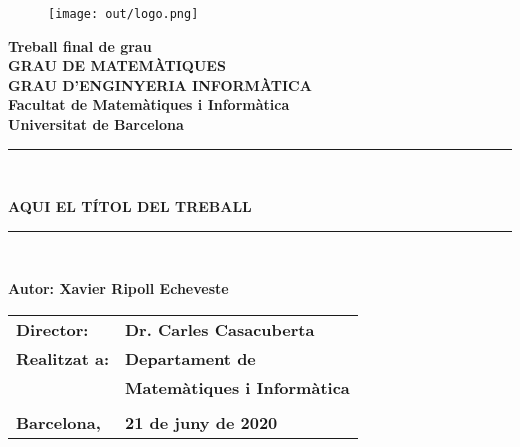 \pagestyle{empty}

\begin{titlepage}
\begin{center}
\begin{figure}[htb]
\begin{center}
\texttt{[image: out/logo.png]}
\end{center}
\end{figure}

\textbf{\LARGE Treball final de grau} \\
\vspace*{.5cm}
\textbf{\LARGE GRAU DE MATEM\`{A}TIQUES } \\
\textbf{\LARGE GRAU D'ENGINYERIA INFORMÀTICA } \\
\vspace*{.5cm}
\textbf{\LARGE Facultat de Matem\`atiques i Inform\`atica\\ Universitat de Barcelona} \\
\vspace*{1.5cm}
\rule{16cm}{0.1mm}\\
\begin{Huge}
\textbf{AQUI EL T\'ITOL DEL TREBALL} \\
\end{Huge}
\rule{16cm}{0.1mm}\\

\vspace{1cm}

\begin{flushright}
\textbf{\LARGE Autor: Xavier Ripoll Echeveste}

\vspace*{2cm}

\renewcommand{\arraystretch}{1.5}
\begin{tabular}{ll}
\textbf{\Large Director:} & \textbf{\Large Dr. Carles Casacuberta } \\
\textbf{\Large Realitzat a:} & \textbf{\Large  Departament de   } \\
 & \textbf{\Large Matemàtiques i Informàtica} \\
\\
\textbf{\Large Barcelona,} & \textbf{\Large 21 de juny de 2020 }
\end{tabular}

\end{flushright}

\end{center}

\end{titlepage}
